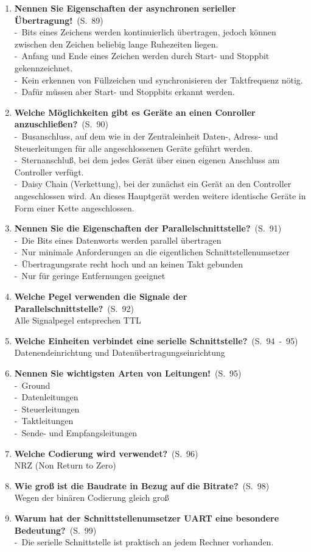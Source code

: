 \documentclass[a4paper,12pt]{article}
\newcommand{\question}[3]{\pagebreak[3]\item {\textbf{#1?}}\ (S.\ #2)#3}
\newcommand{\statement}[3]{\pagebreak[3]\item {\textbf{#1!}}\ (S.\ #2)#3}
\newcommand{\catchword}[1]{\\-\ #1}
\newcommand{\normaltext}[1]{\\#1}
\newcommand{\page}[1]{#1}
\newcommand{\pages}[2]{#1\ -\ #2}
\begin{document}
\begin{enumerate}
  \statement{Nennen Sie Eigenschaften der asynchronen serieller Übertragung}{\page{89}}
  {
    \catchword{Bits eines Zeichens werden kontinuierlich übertragen, jedoch können zwischen den Zeichen
               beliebig lange Ruhezeiten liegen.}
    \catchword{Anfang und Ende eines Zeichen werden durch Start- und Stoppbit gekennzeichnet.}
    \catchword{Kein erkennen von Füllzeichen und synchronisieren der Taktfrequenz nötig.}
    \catchword{Dafür müssen aber Start- und Stoppbits erkannt werden.}
  }

  \question{Welche Möglichkeiten gibt es Geräte an einen Conroller anzuschließen}{\page{90}}
  {
    \catchword{Busanschluss, auf dem wie in der Zentraleinheit Daten-, Adress- und Steuerleitungen
               für alle angeschlossenen Geräte geführt werden.}
    \catchword{Sternanschluß, bei dem jedes Gerät über einen eigenen Anschluss am Controller verfügt.}
    \catchword{Daisy Chain (Verkettung), bei der zunächst ein Gerät an den Controller angeschlossen wird.
               An dieses Hauptgerät werden weitere identische Geräte in Form einer Kette angeschlossen.}
  }

  \question{Nennen Sie die Eigenschaften der Parallelschnittstelle}{\page{91}}
  {
    \catchword{Die Bits eines Datenworts werden parallel übertragen}
    \catchword{Nur minimale Anforderungen an die eigentlichen Schnittstellenumsetzer}
    \catchword{Übertragungsrate recht hoch und an keinen Takt gebunden}
    \catchword{Nur für geringe Entfernungen geeignet}
  }

  \question{Welche Pegel verwenden die Signale der Parallelschnittstelle}{\page{92}}
  {
    \normaltext{Alle Signalpegel entsprechen TTL}
  }

  \question{Welche Einheiten verbindet eine serielle Schnittstelle}{\pages{94}{95}}
  {
    \normaltext{Datenendeinrichtung und Datenübertragungseinrichtung}
  }

  \statement{Nennen Sie wichtigsten Arten von Leitungen}{\page{95}}
  {
    \catchword{Ground}
    \catchword{Datenleitungen}
    \catchword{Steuerleitungen}
    \catchword{Taktleitungen}
    \catchword{Sende- und Empfangsleitungen}
  }

  \question{Welche Codierung wird verwendet}{\page{96}}
  {
    \normaltext{NRZ (Non Return to Zero)}
  }

  \question{Wie groß ist die Baudrate in Bezug auf die Bitrate}{\page{98}}
  {
    \normaltext{Wegen der binären Codierung gleich groß}
  }

  \question{Warum hat der Schnittstellenumsetzer UART eine besondere Bedeutung}{\page{99}}
  {
    \catchword{Die serielle Schnittstelle ist praktisch an jedem Rechner vorhanden.}
  }


\end{enumerate}
\end{document}
